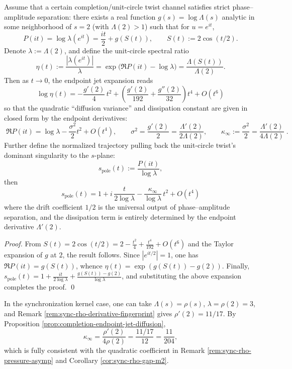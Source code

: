 \begin{proposition}\label{prop:completion-endpoint-jet-diffusion}
Assume that a certain completion/unit-circle twist channel satisfies strict phase--amplitude separation: there exists a real function \(g(s)=\log\Lambda(s)\) analytic in some neighborhood of \(s=2\) (with \(\Lambda(2)>1\)) such that for \(u=e^{it}\),
\[
P(it)=\log\lambda(e^{it})=\frac{it}{2}+g\!\left(S(t)\right),
\qquad
S(t):=2\cos(t/2).
\]
Denote \(\lambda:=\Lambda(2)\), and define the unit-circle spectral ratio
\[
\eta(t):=\frac{|\lambda(e^{it})|}{\lambda}
=\exp\!\bigl(\Re P(it)-\log\lambda\bigr)
=\frac{\Lambda(S(t))}{\Lambda(2)}.
\]
Then as \(t\to 0\), the endpoint jet expansion reads
\[
\boxed{\;
\log\eta(t)
=-\frac{g'(2)}{4}\,t^{2}
+\left(\frac{g'(2)}{192}+\frac{g''(2)}{32}\right)t^{4}
+O(t^{6})\;}
\]
so that the quadratic ``diffusion variance'' and dissipation constant are given in closed form by the endpoint derivatives:
\[
\boxed{\;
\Re P(it)=\log\lambda-\frac{\sigma^{2}}{2}t^{2}+O(t^{4}),\qquad
\sigma^{2}=\frac{g'(2)}{2}=\frac{\Lambda'(2)}{2\Lambda(2)},\qquad
\kappa_\infty:=\frac{\sigma^{2}}{2}=\frac{\Lambda'(2)}{4\Lambda(2)}\; }.
\]
Further define the normalized trajectory pulling back the unit-circle twist's dominant singularity to the \(s\)-plane:
\[
s_{\mathrm{pole}}(t):=\frac{P(it)}{\log\lambda},
\]
then
\[
\boxed{\;
s_{\mathrm{pole}}(t)
=1+i\,\frac{t}{2\log\lambda}-\frac{\kappa_\infty}{\log\lambda}\,t^{2}+O(t^{4})\;}
\]
where the drift coefficient \(1/2\) is the universal output of phase--amplitude separation, and the dissipation term is entirely determined by the endpoint derivative \(\Lambda'(2)\).
\end{proposition}
\begin{proof}
From \(S(t)=2\cos(t/2)=2-\frac{t^{2}}{4}+\frac{t^{4}}{192}+O(t^{6})\) and the Taylor expansion of \(g\) at \(2\), the result follows.
Since \(|e^{it/2}|=1\), one has \(\Re P(it)=g(S(t))\), whence \(\eta(t)=\exp(g(S(t))-g(2))\).
Finally, \(s_{\mathrm{pole}}(t)=1+\frac{it}{2\log\lambda}+\frac{g(S(t))-g(2)}{\log\lambda}\), and substituting the above expansion completes the proof. \qed
\end{proof}

\begin{remark}\label{rem:sync-endpoint-diffusion-check}
In the synchronization kernel case, one can take \(\Lambda(s)=\rho(s)\), \(\lambda=\rho(2)=3\), and Remark \ref{rem:sync-rho-derivative-fingerprint} gives \(\rho'(2)=11/17\).
By Proposition \ref{prop:completion-endpoint-jet-diffusion},
\[
\kappa_\infty=\frac{\rho'(2)}{4\rho(2)}=\frac{11/17}{12}=\frac{11}{204},
\]
which is fully consistent with the quadratic coefficient in Remark \ref{rem:sync-rho-pressure-asymp} and Corollary \ref{cor:sync-rho-gap-m2}.
\end{remark}

